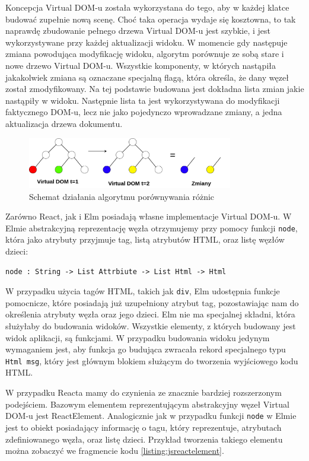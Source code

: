Koncepcja Virtual DOM-u została wykorzystana do tego, aby w każdej klatce budować zupełnie nową scenę. Choć taka operacja wydaje się kosztowna, to tak naprawdę zbudowanie pełnego drzewa Virtual DOM-u jest szybkie, i jest wykorzystywane przy każdej aktualizacji widoku. W momencie gdy następuje zmiana powodująca modyfikację widoku, algorytm porównuje ze sobą stare i nowe drzewo Virtual DOM-u. Wszystkie komponenty, w których nastąpiła jakakolwiek zmiana są oznaczane specjalną flagą, która określa, że dany węzeł został zmodyfikowany. Na tej podstawie budowana jest dokładna lista zmian jakie nastąpiły w widoku. Następnie lista ta jest wykorzystywana do modyfikacji faktycznego DOM-u, lecz nie jako pojedynczo wprowadzane zmiany, a jedna aktualizacja drzewa dokumentu. 

\begin{figure}[h]
	\centering
	\includegraphics[width=0.8\textwidth]{images/diff_algorithm}
	\caption{Schemat działania algorytmu  porównywania różnic}
	\label{fig:diffAlgorithm}
\end{figure}

Zarówno React, jak i Elm posiadają własne implementacje Virtual DOM-u. W Elmie abstrakcyjną reprezentację węzła otrzymujemy przy pomocy funkcji \lstinline{node}, która jako atrybuty przyjmuje tag, listą atrybutów HTML, oraz listę węzłów dzieci:
\begin{lstlisting}[style=elm-style]
	node : String -> List Attrbiute -> List Html -> Html
\end{lstlisting}
W przypadku użycia tagów HTML, takich jak \lstinline{div}, Elm udostępnia funkcje pomocnicze, które posiadają już uzupełniony atrybut tag, pozostawiając nam do określenia atrybuty węzła oraz jego dzieci. Elm nie ma specjalnej składni, która służyłaby do budowania widoków. Wszystkie elementy, z których budowany jest widok aplikacji, są funkcjami. W przypadku budowania widoku jedynym wymaganiem jest, aby funkcja go budująca zwracała rekord specjalnego typu \lstinline[style=elm-style]{Html msg}, który jest głównym blokiem służącym do tworzenia wyjściowego kodu HTML.

W przypadku Reacta mamy do czynienia ze znacznie bardziej rozszerzonym podejściem.  Bazowym elementem reprezentującym abstrakcyjny węzeł Virtual DOM-u jest ReactElement. Analogicznie jak w przypadku funkcji \lstinline{node} w Elmie jest to obiekt posiadający informację o tagu, który reprezentuje, atrybutach zdefiniowanego węzła, oraz listę dzieci. Przykład tworzenia takiego elementu można zobaczyć we fragmencie kodu \ref{listing:jsreactelement}. 

